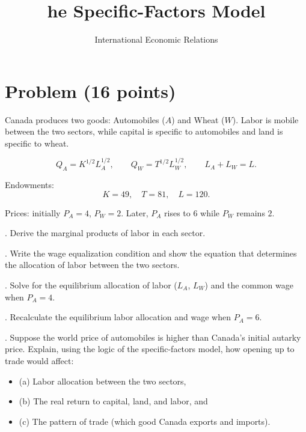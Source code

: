 \documentclass[12pt]{article}
\title{he Specific-Factors Model}
\author{International Economic Relations}
\date{}
\begin{document}

\section*{Problem (16 points)}

Canada produces two goods: Automobiles ($A$) and Wheat ($W$).  
Labor is mobile between the two sectors, while capital is specific to automobiles and land is specific to wheat.

\[
Q_A = K^{1/2}L_A^{1/2}, 
\qquad 
Q_W = T^{1/2}L_W^{1/2},
\qquad 
L_A + L_W = L.
\]

Endowments:
\[
K = 49, \quad T = 81, \quad L = 120.
\]

Prices: initially $P_A = 4$, $P_W = 2$. Later, $P_A$ rises to $6$ while $P_W$ remains $2$.  

\bigskip

. Derive the marginal products of labor in each sector.  

\bigskip

. Write the wage equalization condition and show the equation that determines the allocation of labor between the two sectors.  

\bigskip

. Solve for the equilibrium allocation of labor ($L_A$, $L_W$) and the common wage when $P_A = 4$.  

\bigskip

. Recalculate the equilibrium labor allocation and wage when $P_A = 6$.  

\bigskip



. Suppose the world price of automobiles is higher than Canada’s initial autarky price.  
Explain, using the logic of the specific-factors model, how opening up to trade would affect:  

\begin{itemize}
    \item (a) Labor allocation between the two sectors,  
    \item (b) The real return to capital, land, and labor, and  
    \item (c) The pattern of trade (which good Canada exports and imports).  
\end{itemize}
\end{document}
